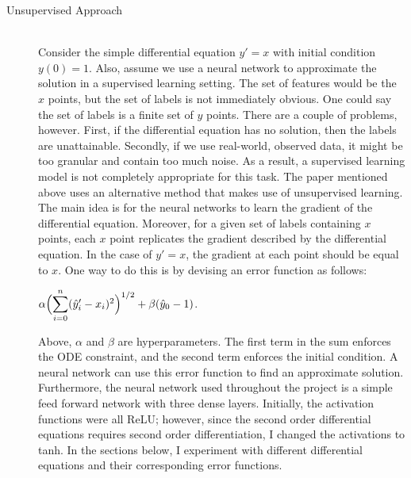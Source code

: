 \documentclass[12pt]{article}
\newcommand{\dsum}[2]{\mathlarger{\sum}_{#1}^{#2}}
\newcommand{\bgc}{\begin{center}}
\newcommand{\enc}{\end{center}}
\begin{document}
\begin{description}
    \item[Unsupervised Approach] \hfill \\
    Consider the simple differential equation $y' = x$ with initial condition
    $y(0) = 1$. Also, assume we use a neural network to approximate the
    solution in a supervised learning setting. The set of features would be the
    $x$ points, but the set of labels is not immediately obvious. One could say
    the set of labels is a finite set of $y$ points. There are a couple of
    problems, however. First, if the differential equation has no solution,
    then the labels are unattainable. Secondly, if we use real-world, observed
    data, it might be too granular and contain too much noise. As a result, a
    supervised learning model is not completely appropriate for this task. The
    paper mentioned above uses an alternative method that makes use of
    unsupervised learning. The main idea is for the neural networks to learn
    the gradient of the differential equation. Moreover, for a given set of
    labels containing $x$ points, each $x$ point replicates the gradient
    described by the differential equation. In the case of $y' = x$, the
    gradient at each point should be equal to $x$. One way to do this is by
    devising an error function as follows: 
    \bgc 
    $\alpha\Bigl(\dsum{i=0}{n}(\hat{y}_i' - x_i)^2\Bigr)^{1/2} + \beta(\hat{y}_0 - 1)$.
    \enc
    Above, $\alpha$ and $\beta$ are hyperparameters. The first term in the sum
    enforces the ODE constraint, and the second term enforces the initial
    condition. A neural network can use this error function to find an
    approximate solution. Furthermore, the neural network used throughout the
    project is a simple feed forward network with three dense layers.
    Initially, the activation functions were all ReLU; however, since the
    second order differential equations requires second order differentiation,
    I changed the activations to tanh. In the sections below, I experiment with
    different differential equations and their corresponding error functions. 


\end{description}
\end{document}
